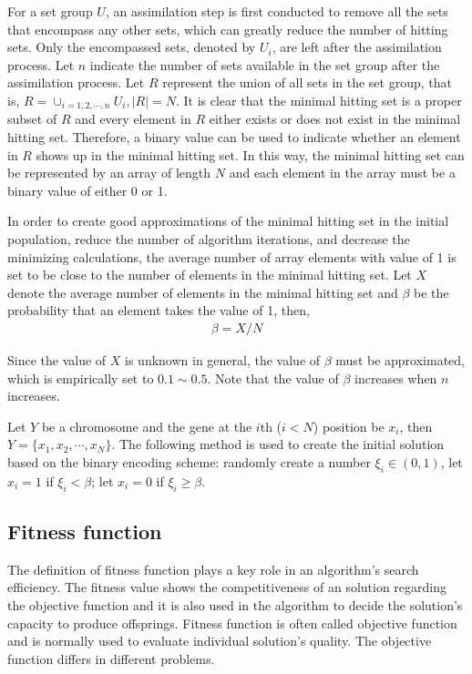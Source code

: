 For a set group $U$, an assimilation step is first conducted to remove all the sets that encompass any other sets, which can greatly reduce the number of hitting sets.
Only the encompassed sets, denoted by $U_i$, are left after the assimilation process. 
Let $n$ indicate the number of sets available in the set group after the assimilation process.
Let $R$ represent the union of all sets in the set group, that is, $R = \cup_{i = 1, 2, \cdots, n}U_i, |R| = N$.
It is clear that the minimal hitting set is a proper subset of $R$ and every element in $R$ either exists or does not exist in the minimal hitting set.
Therefore, a binary value can be used to indicate whether an element in $R$ shows up in the minimal hitting set.
In this way, the minimal hitting set can be represented by an array of length $N$ and each element in the array must be a binary value of either 0 or 1.

In order to create good approximations of the minimal hitting set in the initial population, reduce the number of algorithm iterations, and decrease the minimizing calculations, the average number of array elements with value of 1 is set to be close to the number of elements in the minimal hitting set.
Let $X$ denote the average number of elements in the minimal hitting set and $\beta$ be the probability that an element takes the value of 1, then,
\begin{align}
	\beta = X / N
\end{align}

Since the value of $X$ is unknown in general, the value of $\beta$ must be approximated, which is empirically set to $0.1 \sim 0.5$.
Note that the value of $\beta$ increases when $n$ increases.

Let $Y$ be a chromosome and the gene at the $i$th ($i < N$) position be $x_i$, then $Y = \{x_1, x_2, \cdots, x_N\}$.
The following method is used to create the initial solution based on the binary encoding scheme:
randomly create a number $\xi_i \in (0, 1)$, let $x_i = 1$ if $\xi_i < \beta$; let $x_i = 0$ if $\xi_i \geq \beta$.

\subsection{Fitness function}
The definition of fitness function plays a key role in an algorithm's search efficiency.
The fitness value shows the competitiveness of an solution regarding the objective function and it is also used in the algorithm to decide the solution's capacity to produce offsprings.
Fitness function is often called objective function and is normally used to evaluate individual solution's quality.
The objective function differs in different problems.

